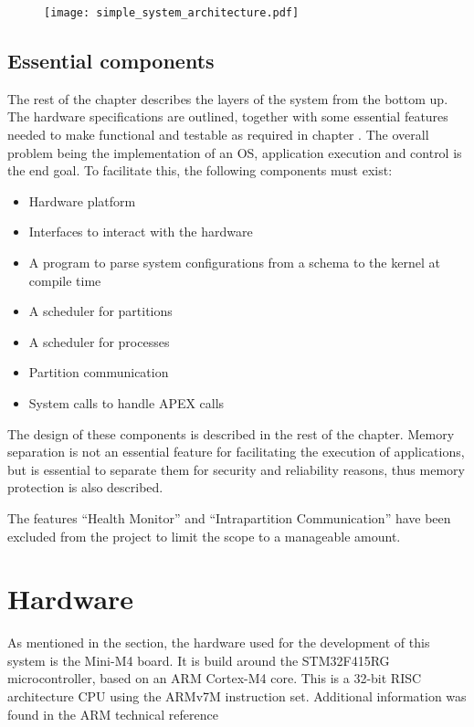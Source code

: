 \begin{figure}[H]
\centering
\texttt{[image: simple\_system\_architecture.pdf]}
\label{fig:simple_system}
\end{figure}


\subsection{Essential components}
\label{design:features}
The rest of the chapter describes the layers of the system from the bottom up.
The hardware specifications are outlined, together with some essential features
needed to make \OSname{} functional and testable as required in chapter
.
The overall problem being the implementation of an \arinc{} OS,
application execution and control is the end goal.
To facilitate this, the following components must exist:
\begin{itemize}
	\item Hardware platform
	\item Interfaces to interact with the hardware
	\item A program to parse system configurations from a schema to the kernel at compile time
	\item A scheduler for partitions
	\item A scheduler for processes
	\item Partition communication
	\item System calls to handle APEX calls
\end{itemize}

The design of these components is described in the rest of the chapter.
Memory separation is not an essential feature for facilitating the execution of applications,
but is essential to separate them for security and reliability reasons,
thus memory protection is also described.

The features ``Health Monitor'' and ``Intrapartition Communication'' have been
excluded from the project to limit the scope to a manageable amount.


\section{Hardware}
As mentioned in the  section,
the hardware used for the development of this system is the Mini-M4
board. It is build around the STM32F415RG microcontroller\cite{stm32_datasheet}, based on
an ARM Cortex-M4 core. This is a 32-bit RISC architecture CPU using
the ARMv7M instruction set\cite{arm_architecture}. Additional information
was found in the ARM technical reference\cite{arm_technical}

